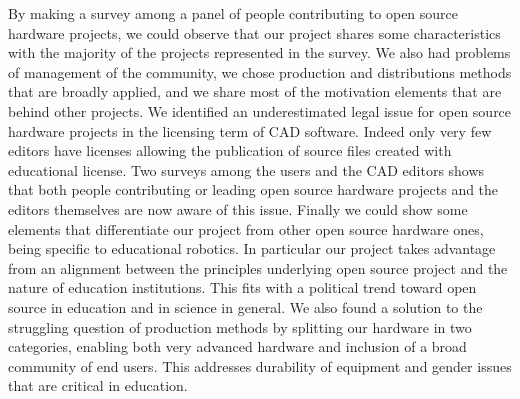 \documentclass[letterpaper, 10 pt, conference]{ieeeconf}  %
\begin{document}
By making a survey among a panel of people contributing to open source hardware projects, we could observe that our project shares some characteristics with the majority of the projects represented in the survey. 
We also had problems of management of the community, we chose production and distributions methods that are broadly applied, and we share most of the motivation elements that are behind other projects.
We identified an underestimated legal issue for open source hardware projects in the licensing term of CAD software.
Indeed only very few editors have licenses allowing the publication of source files created with educational license.
Two surveys among the users and the CAD editors shows that both people contributing or leading open source hardware projects and the editors themselves are now aware of this issue.
Finally we could show some elements that differentiate our project from other open source hardware ones, being specific to educational robotics.
In particular our project takes advantage from an alignment between the principles underlying open source project and the nature of education institutions. 
This fits with a political trend toward open source in education and in science in general.
We also found a solution to the struggling question of production methods by splitting our hardware in two categories, enabling both very advanced hardware and inclusion of a broad community of end users.
This addresses durability of equipment and gender issues that are critical in education.











%
%
%



\end{document}
